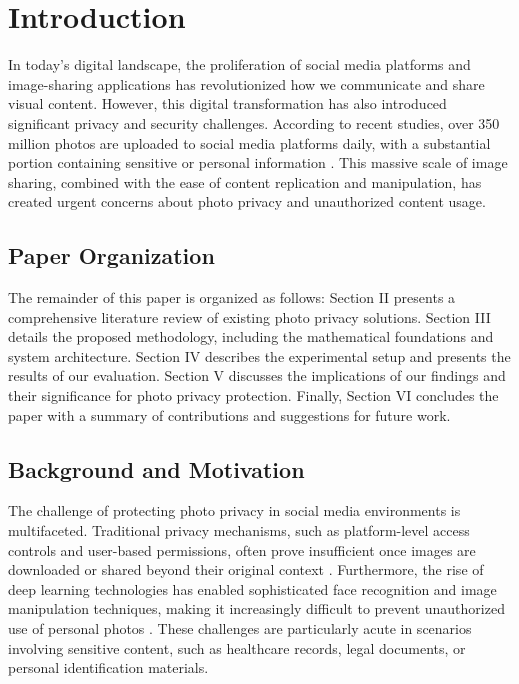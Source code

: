 \documentclass[pdflatex,sn-mathphys-num]{sn-jnl}%
\theoremstyle{thmstyleone}%
\theoremstyle{thmstyletwo}%
\theoremstyle{thmstylethree}%
\begin{document}
\section{Introduction}\label{sec1}

In today's digital landscape, the proliferation of social media platforms and image-sharing applications has revolutionized how we communicate and share visual content. However, this digital transformation has also introduced significant privacy and security challenges. According to recent studies, over 350 million photos are uploaded to social media platforms daily, with a substantial portion containing sensitive or personal information \cite{acm2022}. This massive scale of image sharing, combined with the ease of content replication and manipulation, has created urgent concerns about photo privacy and unauthorized content usage.


\subsection{Paper Organization}
The remainder of this paper is organized as follows: Section II presents a comprehensive literature review of existing photo privacy solutions. Section III details the proposed methodology, including the mathematical foundations and system architecture. Section IV describes the experimental setup and presents the results of our evaluation. Section V discusses the implications of our findings and their significance for photo privacy protection. Finally, Section VI concludes the paper with a summary of contributions and suggestions for future work.

\subsection{Background and Motivation}
The challenge of protecting photo privacy in social media environments is multifaceted. Traditional privacy mechanisms, such as platform-level access controls and user-based permissions, often prove insufficient once images are downloaded or shared beyond their original context \cite{xu2015privacy}. Furthermore, the rise of deep learning technologies has enabled sophisticated face recognition and image manipulation techniques, making it increasingly difficult to prevent unauthorized use of personal photos \cite{deepFace}. These challenges are particularly acute in scenarios involving sensitive content, such as healthcare records, legal documents, or personal identification materials.
\end{document}
